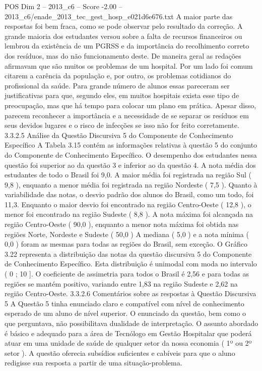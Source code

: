 \begin{textsample}{POS Dim 2 – 2013\_c6 – Score -2.00 – 2013\_c6/enade\_2013\_tec\_gest\_hosp\_e021d6e676.txt}
A maior parte das respostas foi bem fraca, como se pode observar pelo resultado da correção.
A grande maioria dos estudantes versou sobre a falta de recursos financeiros ou lembrou da existência de um PGRSS e da importância do recolhimento correto dos resíduos, mas do não funcionamento deste.
De maneira geral as redações afirmavam que são muitos os problemas de um hospital.
Por um lado foi comum citarem a carência da população e, por outro, os problemas cotidianos do profissional da saúde.
Para grande número de alunos essas pareceram ser justificativas para que, segundo eles, em muitos hospitais exista esse tipo de preocupação, mas que há tempo para colocar um plano em prática.
Apesar disso, parecem reconhecer a importância e a necessidade de se separar os resíduos em seus devidos lugares e o risco de infecções se isso não for feito corretamente. 3.3.2.5 Análise da Questão Discursiva 5 do Componente de Conhecimento Específico A Tabela 3.15 contém as informações relativas à questão 5 do conjunto do Componente de Conhecimento Específico.
O desempenho dos estudantes nessa questão foi superior ao da questão 3 e inferior ao da questão 4.
A nota média dos estudantes de todo o Brasil foi 9,0.
A maior média foi registrada na região Sul ( 9,8 ), enquanto a menor média foi registrada na região Nordeste ( 7,5 ).
Quanto à variabilidade das notas, o desvio padrão dos alunos do Brasil, como um todo, foi 11,3.
Enquanto o maior desvio foi encontrado na região Centro-Oeste ( 12,8 ), o menor foi encontrado na região Sudeste ( 8,8 ).
A nota máxima foi alcançada na região Centro-Oeste ( 90,0 ), enquanto a menor nota máxima foi obtida nas regiões Norte, Nordeste e Sudeste ( 50,0 ) A mediana ( 5,0 ) e a nota mínima ( 0,0 ) foram as mesmas para todas as regiões do Brasil, sem exceção.
O Gráfico 3.22 representa a distribuição das notas da questão discursiva 5 do Componente de Conhecimento Específico.
Esta distribuição é unimodal com moda no intervalo ( 0 ; 10 ].
O coeficiente de assimetria para todos o Brasil é 2,56 e para todas as regiões se mantém positivo, variando entre 1,83 na região Sudeste e 2,62 na região Centro-Oeste. 3.3.2.6 Comentários sobre as respostas à Questão Discursiva 5 A Questão 5 tinha enunciado claro e compatível com nível de conhecimento esperado de um aluno de nível superior.
O enunciado da questão, bem como o que perguntava, não possibilitava dualidade de interpretação.
O assunto abordado é básico e adequado para a área de Tecnólogo em Gestão Hospitalar que poderá atuar em uma unidade de saúde de qualquer setor da nossa economia ( 1º ou 2º setor ).
A questão oferecia subsídios suficientes e cabíveis para que o aluno redigisse sua resposta a partir de uma situação-problema.

\end{textsample}

